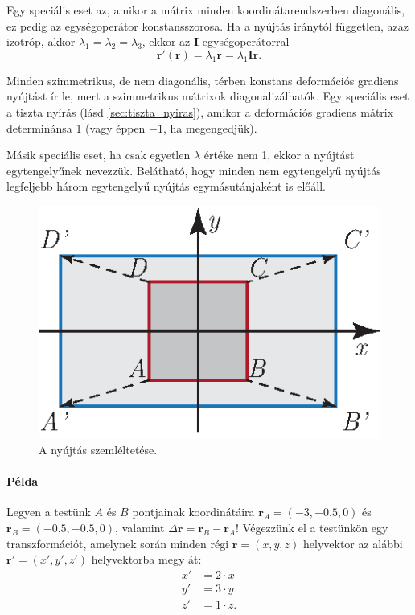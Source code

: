\documentclass[12pt,a4paper]{scrartcl}
\let\mathbf\bm
\begin{document}
Egy speciális eset az, amikor a mátrix minden koordinátarendszerben diagonális, ez pedig az egységoperátor konstansszorosa. Ha a nyújtás iránytól független, azaz izotróp, akkor ${\lambda _1} = {\lambda _2} = {\lambda _3}$, ekkor az ${\mathbf{I}}$ egységoperátorral
\[{\mathbf{r}}'\left( {\mathbf{r}} \right) = {\lambda _1}{\mathbf{r}} = {\lambda _1}{\mathbf{Ir}}.\]

Minden szimmetrikus, de nem diagonális, térben konstans deformációs gradiens nyújtást ír le, mert a szimmetrikus mátrixok diagonalizálhatók. Egy speciális eset a tiszta nyírás (lásd \ref{sec:tiszta_nyiras}), amikor a deformációs gradiens mátrix determinánsa 1 (vagy éppen $-1$, ha megengedjük).

Másik speciális eset, ha csak egyetlen $\lambda$ értéke nem 1, ekkor a nyújtást egytengelyűnek nevezzük. Belátható, hogy minden nem egytengelyű nyújtás legfeljebb három egytengelyű nyújtás egymásutánjaként is előáll.

\begin{figure}[htb] 
\centering    
\includegraphics[scale=1]{figs/nyujtas.eps}
\caption{A nyújtás szemléltetése.}
\label{fig:nyujtas}
\end{figure}

\footnotesize
\paragraph{Példa}
Legyen a testünk $A$ és $B$ pontjainak koordinátáira ${{\mathbf{r}}_A} = \left( { - 3, - 0.5, 0} \right)$ és ${{\mathbf{r}}_B} = \left( { - 0.5, - 0.5, 0} \right)$, valamint $\Delta {\mathbf{r}} = {{\mathbf{r}}_B} - {{\mathbf{r}}_A}$! Végezzünk el a testünkön egy transzformációt, amelynek során minden régi ${\mathbf{r}} = \left( {x,y,z} \right)$ helyvektor az alábbi ${\mathbf{r}}' = \left( {x',y',z'} \right)$ helyvektorba megy át: 
\[\begin{aligned}
  x' &  = 2 \cdot x \\ 
  y' &  = 3 \cdot y \\ 
  z' &  = 1 \cdot z. \\ 
\end{aligned} \]
\end{document}
